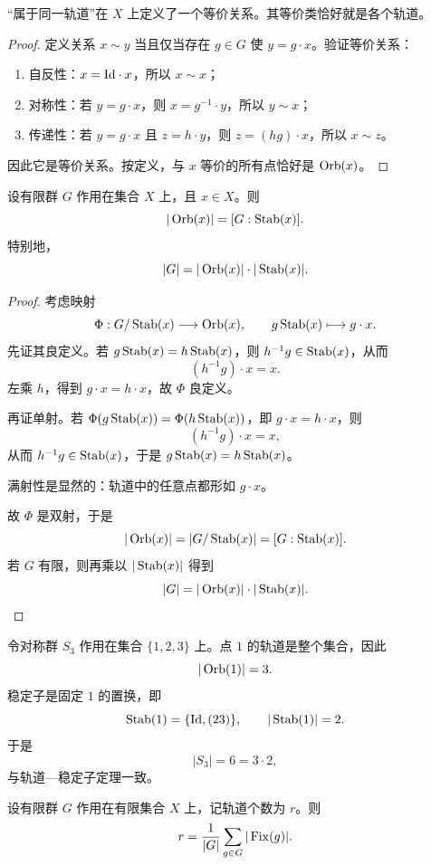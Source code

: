\begin{proposition}
“属于同一轨道”在 $X$ 上定义了一个等价关系。其等价类恰好就是各个轨道。
\end{proposition}

\begin{proof}
定义关系 $x\sim y$ 当且仅当存在 $g\in G$ 使 $y=g\cdot x$。验证等价关系：
\begin{enumerate}
  \item 自反性：$x=\mathrm{Id}\cdot x$，所以 $x\sim x$；
  \item 对称性：若 $y=g\cdot x$，则 $x=g^{-1}\cdot y$，所以 $y\sim x$；
  \item 传递性：若 $y=g\cdot x$ 且 $z=h\cdot y$，则 $z=(hg)\cdot x$，所以 $x\sim z$。
\end{enumerate}
因此它是等价关系。按定义，与 $x$ 等价的所有点恰好是 $\operatorname{Orb}(x)$。
\end{proof}

\begin{theorem}[轨道—稳定子定理]
设有限群 $G$ 作用在集合 $X$ 上，且 $x\in X$。则
\[
|\operatorname{Orb}(x)|=[G:\operatorname{Stab}(x)].
\]
特别地，
\[
|G|=|\operatorname{Orb}(x)|\cdot |\operatorname{Stab}(x)|.
\]
\end{theorem}

\begin{proof}
考虑映射
\[
\Phi:G/\operatorname{Stab}(x)\longrightarrow \operatorname{Orb}(x),
\qquad g\operatorname{Stab}(x)\longmapsto g\cdot x.
\]
先证其良定义。若 $g\operatorname{Stab}(x)=h\operatorname{Stab}(x)$，则 $h^{-1}g\in \operatorname{Stab}(x)$，从而
\[
(h^{-1}g)\cdot x=x.
\]
左乘 $h$，得到 $g\cdot x=h\cdot x$，故 $\Phi$ 良定义。

再证单射。若 $\Phi(g\operatorname{Stab}(x))=\Phi(h\operatorname{Stab}(x))$，即 $g\cdot x=h\cdot x$，则
\[
(h^{-1}g)\cdot x=x,
\]
从而 $h^{-1}g\in \operatorname{Stab}(x)$，于是 $g\operatorname{Stab}(x)=h\operatorname{Stab}(x)$。

满射性是显然的：轨道中的任意点都形如 $g\cdot x$。

故 $\Phi$ 是双射，于是
\[
|\operatorname{Orb}(x)|=|G/\operatorname{Stab}(x)|=[G:\operatorname{Stab}(x)].
\]
若 $G$ 有限，则再乘以 $|\operatorname{Stab}(x)|$ 得到
\[
|G|=|\operatorname{Orb}(x)|\cdot |\operatorname{Stab}(x)|.
\]
\end{proof}

\begin{example}
令对称群 $S_3$ 作用在集合 $\{1,2,3\}$ 上。点 $1$ 的轨道是整个集合，因此
\[
|\operatorname{Orb}(1)|=3.
\]
稳定子是固定 $1$ 的置换，即
\[
\operatorname{Stab}(1)=\{\mathrm{Id},(23)\},
\qquad |\operatorname{Stab}(1)|=2.
\]
于是
\[
|S_3|=6=3\cdot 2,
\]
与轨道—稳定子定理一致。
\end{example}

\begin{theorem}[Burnside 引理]
设有限群 $G$ 作用在有限集合 $X$ 上，记轨道个数为 $r$。则
\[
r=\frac{1}{|G|}\sum_{g\in G}|\operatorname{Fix}(g)|.
\]
\end{theorem}

